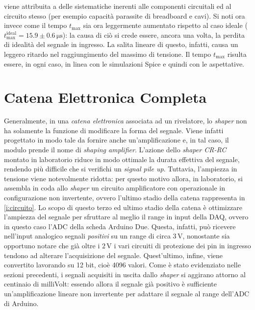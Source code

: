 \documentclass[a4paper,11pt]{article} %
\begin{document}
viene attribuita a delle sistematiche inerenti alle componenti circuitali ed al circuito stesso (per esempio capacità
parassite di breadboard e cavi). Si noti ora invece come il tempo $t_{\text{max}}$ sia ora leggermente aumentato
rispetto al caso ideale ($t_{\text{max}}^{\text{ideal}} = 15.9 \pm 0.6 \,\si{\us}$): la causa di ciò si crede essere,
ancora una volta, la perdita di idealità del segnale in ingresso. La salita lineare di questo, infatti, causa un leggero
ritardo nel raggiungimento del massimo di tensione. Il tempo $t_{\text{max}}$ risulta essere, in ogni caso, in linea con
le simulazioni Spice e quindi con le aspettative. 



\section{Catena Elettronica Completa}\label{s:catena}

Generalmente, in una \textit{catena elettronica} associata ad un rivelatore, lo \textit{shaper} non ha solamente la
funzione di modificare la forma del segnale. Viene infatti progettato in modo tale da fornire anche un'amplificazione e,
in tal caso, il modulo prende il nome di \textit{shaping amplifier}. L'azione dello \textit{shaper CR-RC} montato in
laboratorio riduce in modo ottimale la durata effettiva del segnale, rendendo più difficile che si verifichi un
\textit{signal pile up}. Tuttavia, l'ampiezza in tensione viene notevolmente ridotta: per questo motivo allora, in
laboratorio, si assembla in coda allo \textit{shaper} un circuito amplificatore con operazionale in configurazione non
invertente, ovvero l'ultimo stadio della catena rappresenta in \autoref{i:circuito}. Lo scopo di questo terzo ed ultimo
stadio della catena è ottimizzare l'ampiezza del segnale per sfruttare al meglio il range in input della DAQ, ovvero in
questo caso l'ADC della scheda Arduino Due. Questa, infatti, può ricevere nell'input analogico segnali \textit{positivi}
su un range di circa $3\,\si{\volt}$, nonostante sia opportuno notare che già oltre i $2\,\si{\volt}$ i vari circuiti di
protezione dei pin in ingresso tendono ad alterare l'acquisizione del segnale. Quest'ultimo, infine, viene convertito
lavorando su 12 bit, cioè 4096 valori. Come è stato evidenziato nelle sezioni precedenti, i segnali acquisiti in uscita
dallo \textit{shaper} si aggirano attorno al centinaio di milliVolt: essendo allora il segnale già positivo è
sufficiente un'amplificazione lineare non invertente per adattare il segnale al range dell'ADC di Arduino. 
\end{document}
